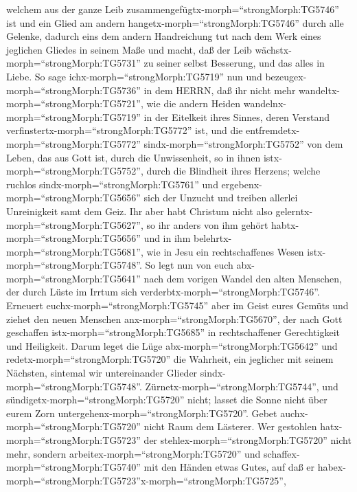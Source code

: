 welchem aus der ganze Leib zusammengefügtx-morph=``strongMorph:TG5746''
ist und ein Glied am andern hangetx-morph=``strongMorph:TG5746'' durch
alle Gelenke, dadurch eins dem andern Handreichung tut nach dem Werk
eines jeglichen Gliedes in seinem Maße und macht, daß der Leib
wächstx-morph=``strongMorph:TG5731'' zu seiner selbst Besserung, und das
alles in Liebe.  So sage ichx-morph=``strongMorph:TG5719''
nun und bezeugex-morph=``strongMorph:TG5736'' in dem HERRN, daß ihr
nicht mehr wandeltx-morph=``strongMorph:TG5721'', wie die andern Heiden
wandelnx-morph=``strongMorph:TG5719'' in der Eitelkeit ihres Sinnes,
 deren Verstand verfinstertx-morph=``strongMorph:TG5772''
ist, und die entfremdetx-morph=``strongMorph:TG5772''
sindx-morph=``strongMorph:TG5752'' von dem Leben, das aus Gott ist,
durch die Unwissenheit, so in ihnen istx-morph=``strongMorph:TG5752'',
durch die Blindheit ihres Herzens;  welche ruchlos
sindx-morph=``strongMorph:TG5761'' und
ergebenx-morph=``strongMorph:TG5656'' sich der Unzucht und treiben
allerlei Unreinigkeit samt dem Geiz.  Ihr aber habt
Christum nicht also gelerntx-morph=``strongMorph:TG5627'', 
so ihr anders von ihm gehört habtx-morph=``strongMorph:TG5656'' und in
ihm belehrtx-morph=``strongMorph:TG5681'', wie in Jesu ein
rechtschaffenes Wesen istx-morph=``strongMorph:TG5748''. 
So legt nun von euch abx-morph=``strongMorph:TG5641'' nach dem vorigen
Wandel den alten Menschen, der durch Lüste im Irrtum sich
verderbtx-morph=``strongMorph:TG5746''.  Erneuert
euchx-morph=``strongMorph:TG5745'' aber im Geist eures Gemüts
 und ziehet den neuen Menschen
anx-morph=``strongMorph:TG5670'', der nach Gott geschaffen
istx-morph=``strongMorph:TG5685'' in rechtschaffener Gerechtigkeit und
Heiligkeit.  Darum leget die Lüge
abx-morph=``strongMorph:TG5642'' und redetx-morph=``strongMorph:TG5720''
die Wahrheit, ein jeglicher mit seinem Nächsten, sintemal wir
untereinander Glieder sindx-morph=``strongMorph:TG5748''. 
Zürnetx-morph=``strongMorph:TG5744'', und
sündigetx-morph=``strongMorph:TG5720'' nicht; lasset die Sonne nicht
über eurem Zorn untergehenx-morph=``strongMorph:TG5720''. 
Gebet auchx-morph=``strongMorph:TG5720'' nicht Raum dem Lästerer.
 Wer gestohlen hatx-morph=``strongMorph:TG5723'' der
stehlex-morph=``strongMorph:TG5720'' nicht mehr, sondern
arbeitex-morph=``strongMorph:TG5720'' und
schaffex-morph=``strongMorph:TG5740'' mit den Händen etwas Gutes, auf
daß er habex-morph=``strongMorph:TG5723''x-morph=``strongMorph:TG5725'',

